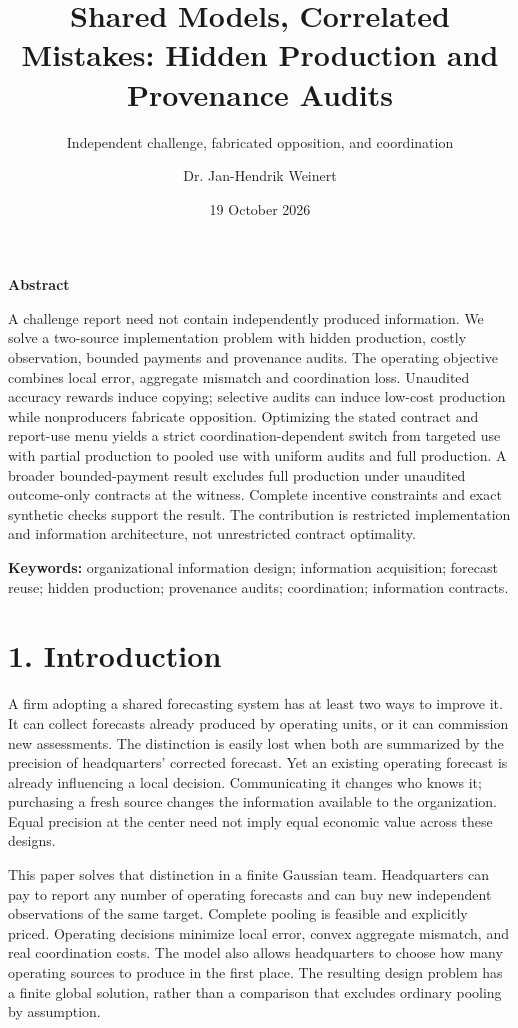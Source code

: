 \documentclass[
  11pt,
]{article}
\title{Shared Models, Correlated Mistakes: Hidden Production and
Provenance Audits}
\subtitle{Independent challenge, fabricated opposition, and
coordination}
\author{Dr. Jan-Hendrik Weinert}
\date{19 October 2026}
\makeatletter
\renewcommand{\maketitle}{%
  \begin{center}
  {\LARGE\bfseries\@title\par}
  \vspace{0.8em}
  {\normalsize\@author\par}
  \vspace{0.35em}
  {\small\@date\par}
  \end{center}
  \vspace{0.4em}}
\renewenvironment{abstract}{%
  \begin{center}\small\bfseries Abstract\end{center}
  \begin{list}{}{\setlength{\leftmargin}{0.5in}\setlength{\rightmargin}{0.5in}}
  \item[]\small\setlength{\parindent}{0pt}\ignorespaces
}{\end{list}\vspace{0.6em}}
\makeatother
\begin{document}
\maketitle
\begin{abstract}
A challenge report need not contain independently produced information. We solve a two-source implementation problem with hidden production, costly observation, bounded payments and provenance audits. The operating objective combines local error, aggregate mismatch and coordination loss. Unaudited accuracy rewards induce copying; selective audits can induce low-cost production while nonproducers fabricate opposition. Optimizing the stated contract and report-use menu yields a strict coordination-dependent switch from targeted use with partial production to pooled use with uniform audits and full production. A broader bounded-payment result excludes full production under unaudited outcome-only contracts at the witness. Complete incentive constraints and exact synthetic checks support the result. The contribution is restricted implementation and information architecture, not unrestricted contract optimality.
\end{abstract}
\noindent\small \textbf{Keywords:} organizational information design; information
acquisition; forecast reuse; hidden production; provenance audits;
coordination; information contracts.\par\normalsize
\vspace{0.6em}
\section{1. Introduction}\label{introduction}

A firm adopting a shared forecasting system has at least two ways to
improve it. It can collect forecasts already produced by operating
units, or it can commission new assessments. The distinction is easily
lost when both are summarized by the precision of headquarters'
corrected forecast. Yet an existing operating forecast is already
influencing a local decision. Communicating it changes who knows it;
purchasing a fresh source changes the information available to the
organization. Equal precision at the center need not imply equal
economic value across these designs.

This paper solves that distinction in a finite Gaussian team.
Headquarters can pay to report any number of operating forecasts and can
buy new independent observations of the same target. Complete pooling is
feasible and explicitly priced. Operating decisions minimize local
error, convex aggregate mismatch, and real coordination costs. The model
also allows headquarters to choose how many operating sources to produce
in the first place. The resulting design problem has a finite global
solution, rather than a comparison that excludes ordinary pooling by
assumption.
\end{document}

